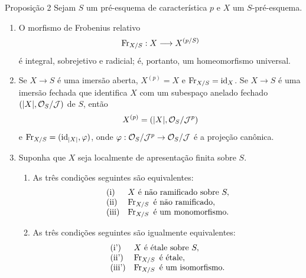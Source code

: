 \begin{statement}{Proposição 2}
Sejam $S$ um pré-esquema de característica $p$ e $X$ um $S$-pré-esquema.
\begin{enumerate}[label=\alph*)]
\item O morfismo de Frobenius relativo
\[
\operatorname{Fr}_{X/S}:X\longrightarrow X^{(p/S)}
\]
é integral, sobrejetivo e radicial; é, portanto, um homeomorfismo universal.

\item Se $X\to S$ é uma imersão aberta, $X^{(p)}=X$ e $\operatorname{Fr}_{X/S}=\operatorname{id}_X$. Se $X\to S$ é uma imersão fechada que identifica $X$ com um subespaço anelado fechado $(|X|,\mathcal{O}_S/\mathcal J)$ de $S$, então
\[
X^{(p)}=(|X|,\mathcal{O}_S/\mathcal J^p)
\]
e $\operatorname{Fr}_{X/S}=(\operatorname{id}_{|X|},\varphi)$, onde $\varphi:\mathcal{O}_S/\mathcal J^p\to\mathcal{O}_S/\mathcal J$ é a projeção canônica.

\item Suponha que $X$ seja localmente de apresentação finita sobre $S$.
\begin{enumerate}[label=\arabic*)]
\item As três condições seguintes são equivalentes:
\[
\begin{array}{ll}
\text{(i)}& X\text{ é não ramificado sobre }S,\\
\text{(ii)}& \operatorname{Fr}_{X/S}\text{ é não ramificado},\\
\text{(iii)}& \operatorname{Fr}_{X/S}\text{ é um monomorfismo}.
\end{array}
\]
\item As três condições seguintes são igualmente equivalentes:
\[
\begin{array}{ll}
\text{(i')}& X\text{ é étale sobre }S,\\
\text{(ii')}& \operatorname{Fr}_{X/S}\text{ é étale},\\
\text{(iii')}& \operatorname{Fr}_{X/S}\text{ é um isomorfismo}.
\end{array}
\]
\end{enumerate}
\end{enumerate}
\end{statement}
